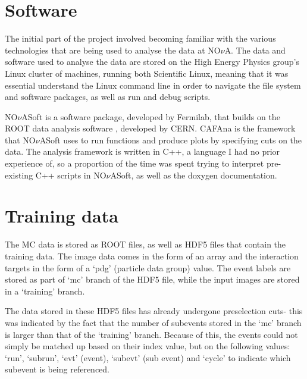 \onehalfspacing

\section{Software}

\noindent The initial part of the project involved becoming familiar with the various technologies that are being used to analyse the data at NO$\nu$A. The data and software used to analyse the data are stored on the High Energy Physics group’s Linux cluster of machines, running both Scientific Linux, meaning that it was essential understand the Linux command line in order to navigate the file system and software packages, as well as run and debug scripts. \medskip

\noindent NO$\nu$ASoft is a software package, developed by Fermilab, that builds on the ROOT data analysis software \cite{Brun}, developed by CERN. CAFAna is the framework that NO$\nu$ASoft uses to run functions and produce plots by specifying cuts on the data. The  analysis framework is written in C++, a language I had no prior experience of, so a proportion of the time was spent trying to interpret pre-existing C++ scripts in NO$\nu$ASoft, as well as the doxygen documentation. \medskip



\section{Training data}

\noindent The MC data is stored as ROOT files, as well as HDF5 files that contain the training data. The image data comes in the form of an array and the interaction targets in the form of a ‘pdg’ (particle data group) value. The event labels are stored as part of ‘mc’ branch of the HDF5 file, while the input images are stored in a ‘training’ branch. \medskip

\noindent The data stored in these HDF5 files has already undergone preselection cuts- this was indicated by the fact that the number of subevents stored in the ‘mc’ branch is larger than that of the ‘training’ branch. Because of this, the events could not simply be matched up based on their index value, but on the following values: ‘run’, ‘subrun’, ‘evt’ (event), ‘subevt’ (sub event) and ‘cycle’ to indicate which subevent is being referenced. \medskip

